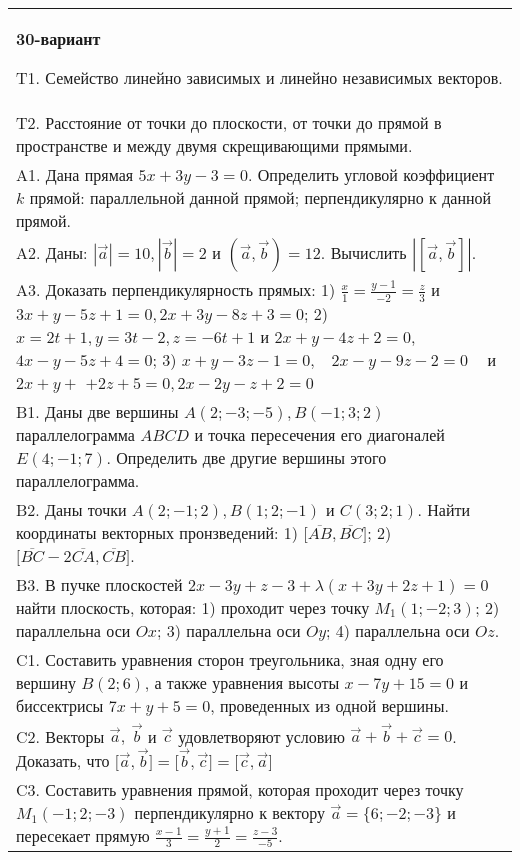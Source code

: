 \documentclass{article}
\begin{document}
\begin{tabular}{m{17cm}}
\textbf{30-вариант}
\newline

T1. 
Семейство линейно зависимых и линейно независимых векторов.
 \\
T2. 
Расстояние от точки до плоскости, от точки до прямой в пространстве и между двумя скрещивающими прямыми. \\
A1. 
Дана прямая \(5x + 3y - 3 = 0\). Определить угловой коэффициент \(k\) прямой: параллельной данной прямой; перпендикулярно к данной прямой.
 \\
A2. 
Даны: \(|\overrightarrow{a}| = 10,|\overrightarrow{b}| = 2\) и \(\left( \overrightarrow{a},\overrightarrow{b} \right) = 12\). Вычислить \(\left| \left\lbrack \overrightarrow{a},\overrightarrow{b} \right\rbrack \right|\).
 \\
A3. 
Доказать перпендикулярность прямых: 1) \(\frac{x}{1} = \frac{y - 1}{- 2} = \frac{z}{3}\) и \(3x + y - 5z + 1 = 0,2x + 3y - 8z + 3 = 0\); 2) \(x = 2t + 1,y = 3t - 2,z = - 6t + 1\) и \(2x + y - 4z + 2 = 0\), \(4x - y - 5z + 4 = 0\); 3) \(x + y - 3z - 1 = 0,\ \ \ \ 2x - y - 9z - 2 = 0\ \ \ \ \) и \(2x + y +\) \(+ 2z + 5 = 0,2x - 2y - z + 2 = 0\)
 \\
B1. 
Даны две вершины \(A(2; - 3; - 5),B( - 1;3;2)\) параллелограмма \(ABCD\) и точка пересечения его диагоналей \(E(4; - 1;7)\). Определить две другие вершины этого параллелограмма.
 \\
B2. 
Даны точки \(A(2; - 1;2),B(1;2; - 1)\) и \(C(3;2;1)\). Найти координаты векторных пронзведений: 1) \(\lbrack\overline{AB},\overline{BC}\rbrack\); 2) \(\lbrack\overline{BC} - 2\overline{CA},\overline{CB}\rbrack\).
 \\
B3. 
В пучке плоскостей \(2x - 3y + z - 3 + \lambda(x + 3y + 2z + 1) = 0\) найти плоскость, которая: 1) проходит через точку \(M_{1}(1; - 2;3)\); 2) параллельна оси \(Ox\); 3) параллельна оси \(Oy\); 4) параллельна оси \(Oz\).
 \\
C1. 
Составить уравнения сторон треугольника, зная одну его вершину \(B(2;6)\), а также уравнения высоты \(x - 7y + 15 = 0\) и биссектрисы \(7x + y + 5 = 0\), проведенных из одной вершины.
 \\
C2. 
Векторы \(\overrightarrow{a},\ \overrightarrow{b}\) и \(\overrightarrow{c}\) удовлетворяют условию \(\overrightarrow{a} + \overrightarrow{b} + \overrightarrow{c} = 0\). Доказать, что \(\lbrack\overrightarrow{a},\overrightarrow{b}\rbrack = \lbrack\overrightarrow{b},\overrightarrow{c}\rbrack = \lbrack\overrightarrow{c},\overrightarrow{a}\rbrack\)
 \\
C3. 
Составить уравнения прямой, которая проходит через точку \(M_{1}( - 1;2; - 3)\) перпендикулярно к вектору \(\overrightarrow{a} = \{ 6; - 2; - 3\}\) и пересекает прямую \(\frac{x - 1}{3} = \frac{y + 1}{2} = \frac{z - 3}{- 5}\).
 \\

\end{tabular}
\vspace{1cm}
\end{document}
